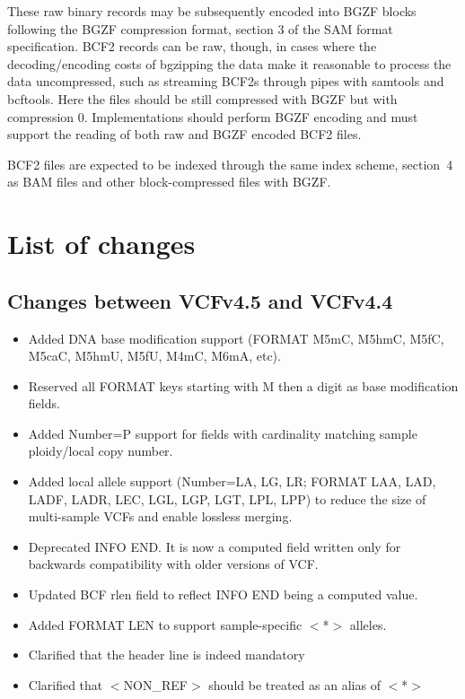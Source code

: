 \documentclass[8pt]{article}
\begin{document}
These raw binary records may be subsequently encoded into BGZF blocks following the BGZF compression format, section 3 of the SAM format specification.
BCF2 records can be raw, though, in cases where the decoding/encoding costs of bgzipping the data make it reasonable to process the data uncompressed, such as streaming BCF2s through pipes with samtools and bcftools.
Here the files should be still compressed with BGZF but with compression 0.
Implementations should perform BGZF encoding and must support the reading of both raw and BGZF encoded BCF2 files.

BCF2 files are expected to be indexed through the same index scheme, section~4 as BAM files and other block-compressed files with BGZF.

\section{List of changes}

\subsection{Changes between VCFv4.5 and VCFv4.4}

\begin{itemize}
	\item Added DNA base modification support (FORMAT M5mC, M5hmC, M5fC, M5caC, M5hmU, M5fU, M4mC, M6mA, etc).
	\item Reserved all FORMAT keys starting with M then a digit as base modification fields.
	\item Added Number=P support for fields with cardinality matching sample ploidy/local copy number.
	\item Added local allele support (Number=LA, LG, LR; FORMAT LAA, LAD, LADF, LADR, LEC, LGL, LGP, LGT, LPL, LPP) to reduce the size of multi-sample VCFs and enable lossless merging.
	\item Deprecated INFO END. It is now a computed field written only for backwards compatibility with older versions of VCF.
	\item Updated BCF rlen field to reflect INFO END being a computed value.
	\item Added FORMAT LEN to support sample-specific $<$*$>$ alleles.
	\item Clarified that the header line is indeed mandatory
	\item Clarified that $<$NON\_REF$>$ should be treated as an alias of $<$*$>$
\end{itemize}
\end{document}
